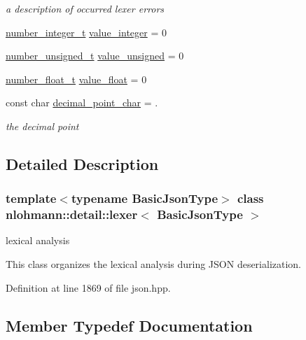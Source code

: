 \begin{DoxyCompactItemize}
\begin{DoxyCompactList}\small\item\em a description of occurred lexer errors \end{DoxyCompactList}\item 
\hyperlink{classnlohmann_1_1detail_1_1lexer_a9cd1b11cc67edbfb2613c788b5bd337c}{number\+\_\+integer\+\_\+t} \hyperlink{classnlohmann_1_1detail_1_1lexer_a353d8eeca5b2f21b3e88540c17afb9bc}{value\+\_\+integer} = 0
\item 
\hyperlink{classnlohmann_1_1detail_1_1lexer_a105d1dfeab414a572655895cdd96a52a}{number\+\_\+unsigned\+\_\+t} \hyperlink{classnlohmann_1_1detail_1_1lexer_af250180459c23ca71c3e10a99fb5ba3e}{value\+\_\+unsigned} = 0
\item 
\hyperlink{classnlohmann_1_1detail_1_1lexer_aa7f9e7b2bcd311fb86e2da43761a6619}{number\+\_\+float\+\_\+t} \hyperlink{classnlohmann_1_1detail_1_1lexer_a861ce804da2d257ee373d1e0b55780e1}{value\+\_\+float} = 0
\item 
const char \hyperlink{classnlohmann_1_1detail_1_1lexer_a16593b0475f6d1cddd5eaf7c045771f3}{decimal\+\_\+point\+\_\+char} = \textquotesingle{}.\textquotesingle{}
\begin{DoxyCompactList}\small\item\em the decimal point \end{DoxyCompactList}\end{DoxyCompactItemize}


\subsection{Detailed Description}
\subsubsection*{template$<$typename Basic\+Json\+Type$>$\newline
class nlohmann\+::detail\+::lexer$<$ Basic\+Json\+Type $>$}

lexical analysis 

This class organizes the lexical analysis during J\+S\+ON deserialization. 

Definition at line 1869 of file json.\+hpp.



\subsection{Member Typedef Documentation}
\mbox{\label{classnlohmann_1_1detail_1_1lexer_aa7f9e7b2bcd311fb86e2da43761a6619}} 

